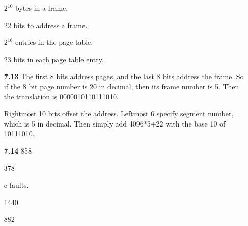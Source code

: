 \documentclass{article}
\begin{document}
\begin{enumerate}
$2^{10}$ bytes in a frame.

22 bits to address a frame.

$2^{16}$ entries in the page table.

23 bits in each page table entry.

\item[\textbf{7.13}]
The first 8 bits address pages, and the last 8 bits address the frame. So if
the 8 bit page number is 20 in decimal, then its frame number is 5. Then the
translation is 0000010110111010.

Rightmost 10 bits offset the address. Leftmost 6 specify segment number, which
is 5 in decimal. Then simply add 4096*5+22 with the base 10 of 10111010.

\item[\textbf{7.14}]
858

378

c faults.

1440

882

\end{enumerate}
\end{document}
